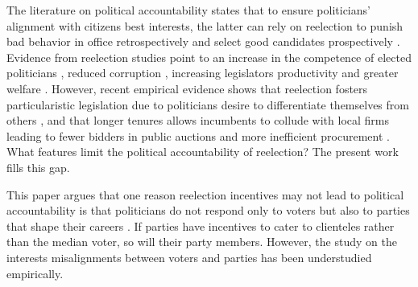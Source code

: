 \documentclass[12pt]{amsart}
\makeatletter
\def\section{\@startsection{section}{1}
	\z@{1.0\linespacing\@plus\linespacing}{.5\linespacing}{\Large}}
\numberwithin{equation}{section}
\theoremstyle{definition}
\theoremstyle{definition}
\theoremstyle{definition}
\makeatother
\begin{document}
\clearpage



\section{Introduction}

     

The literature on political accountability states that to ensure politicians' alignment with citizens best interests, the latter can rely on reelection to punish bad behavior in office retrospectively and select good candidates prospectively \citep{manin_etal_1999}. Evidence from reelection studies point to an increase in the competence of elected politicians \citep{dalbo_etal_2017}, reduced corruption \citep{ferraz_finan_2011}, increasing legislators productivity \citep{hall_etal_2018} and greater welfare \citep{alt_etal_2011}. However, recent empirical evidence shows that reelection fosters particularistic legislation due to politicians desire to differentiate themselves from others \citep{motolinia_2020}, and that longer tenures allows incumbents to collude with local firms leading to fewer bidders in public auctions and more inefficient procurement \citep{coviello_etal_2017}. %
What features limit the political accountability of reelection? The present work fills this gap.       

This paper argues that one reason reelection incentives may not lead to political accountability is that politicians do not respond only to voters but also to parties that shape their careers \citep{mayhew_1974,moreno_etal_2003,samuels_shugart_2010, klasnja_titiunik_2017}. If parties have incentives to cater to clienteles rather than the median voter, so will their party members. However, the study on the interests misalignments between voters and parties has been understudied empirically. %
\end{document}
